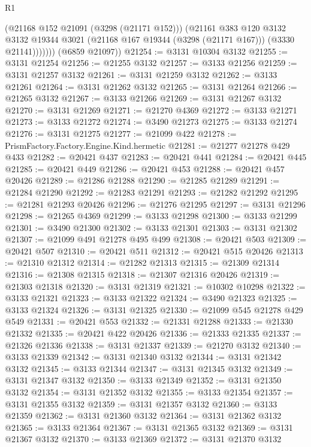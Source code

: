 \begin{lexlean}{R1}
\begin{coremodule}
                (@21168 @152 @21091 (@3298 (@21171 @152)))
                (@21161
                  @383
                  @120
                  @3132
                  @3132
                  @19344
                  @3021
                  (@21168 @167 @19344 (@3298 (@21171 @167)))
                  (@3330 @21141)))))))
      (@6859 @21097))
@21254 := @3131 @10304 @3132
@21255 := @3131 @21254
@21256 := @21255 @3132
@21257 := @3133 @21256
@21259 := @3131 @21257 @3132
@21261 := @3131 @21259 @3132
@21262 := @3133 @21261
@21264 := @3131 @21262 @3132
@21265 := @3131 @21264
@21266 := @21265 @3132
@21267 := @3133 @21266
@21269 := @3131 @21267 @3132
@21270 := @3131 @21269
@21271 := @21270 @4369
@21272 := @3133 @21271
@21273 := @3133 @21272
@21274 := @3490 @21273
@21275 := @3133 @21274
@21276 := @3131 @21275
@21277 := @21099 @422
@21278 := PrismFactory.Factory.Engine.Kind.hermetic
@21281 := @21277 @21278 @429 @433
@21282 := @20421 @437
@21283 := @20421 @441
@21284 := @20421 @445
@21285 := @20421 @449
@21286 := @20421 @453
@21288 := @20421 @457 @20426
@21289 := @21286 @21288
@21290 := @21285 @21289
@21291 := @21284 @21290
@21292 := @21283 @21291
@21293 := @21282 @21292
@21295 := @21281 @21293 @20426
@21296 := @21276 @21295
@21297 := @3131 @21296
@21298 := @21265 @4369
@21299 := @3133 @21298
@21300 := @3133 @21299
@21301 := @3490 @21300
@21302 := @3133 @21301
@21303 := @3131 @21302
@21307 := @21099 @491 @21278 @495 @499
@21308 := @20421 @503
@21309 := @20421 @507
@21310 := @20421 @511
@21312 := @20421 @515 @20426
@21313 := @21310 @21312
@21314 := @21282 @21313
@21315 := @21309 @21314
@21316 := @21308 @21315
@21318 := @21307 @21316 @20426
@21319 := @21303 @21318
@21320 := @3131 @21319
@21321 := @10302 @10298
@21322 := @3133 @21321
@21323 := @3133 @21322
@21324 := @3490 @21323
@21325 := @3133 @21324
@21326 := @3131 @21325
@21330 := @21099 @545 @21278 @429 @549
@21331 := @20421 @553
@21332 := @21331 @21288
@21333 := @21330 @21332
@21335 := @20421 @422 @20426
@21336 := @21333 @21335
@21337 := @21326 @21336
@21338 := @3131 @21337
@21339 := @21270 @3132
@21340 := @3133 @21339
@21342 := @3131 @21340 @3132
@21344 := @3131 @21342 @3132
@21345 := @3133 @21344
@21347 := @3131 @21345 @3132
@21349 := @3131 @21347 @3132
@21350 := @3133 @21349
@21352 := @3131 @21350 @3132
@21354 := @3131 @21352 @3132
@21355 := @3133 @21354
@21357 := @3131 @21355 @3132
@21359 := @3131 @21357 @3132
@21360 := @3133 @21359
@21362 := @3131 @21360 @3132
@21364 := @3131 @21362 @3132
@21365 := @3133 @21364
@21367 := @3131 @21365 @3132
@21369 := @3131 @21367 @3132
@21370 := @3133 @21369
@21372 := @3131 @21370 @3132

\end{coremodule}
\end{lexlean}
